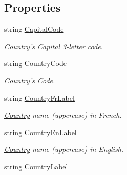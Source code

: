 \subsection*{Properties}
\begin{DoxyCompactItemize}
\item 
string \hyperlink{class_thecallr_api_1_1_objects_1_1_misc_1_1_country_ae5472779a7e2e53b6340faa3e8fca171}{Capital\+Code}
\begin{DoxyCompactList}\small\item\em \hyperlink{class_thecallr_api_1_1_objects_1_1_misc_1_1_country}{Country}'s Capital 3-\/letter code. \end{DoxyCompactList}\item 
string \hyperlink{class_thecallr_api_1_1_objects_1_1_misc_1_1_country_ad53605ad72d876c812539599fddee9a3}{Country\+Code}
\begin{DoxyCompactList}\small\item\em \hyperlink{class_thecallr_api_1_1_objects_1_1_misc_1_1_country}{Country}'s Code. \end{DoxyCompactList}\item 
string \hyperlink{class_thecallr_api_1_1_objects_1_1_misc_1_1_country_a720ea690f46e37e46d7174eb634778da}{Country\+Fr\+Label}
\begin{DoxyCompactList}\small\item\em \hyperlink{class_thecallr_api_1_1_objects_1_1_misc_1_1_country}{Country} name (uppercase) in French. \end{DoxyCompactList}\item 
string \hyperlink{class_thecallr_api_1_1_objects_1_1_misc_1_1_country_a7cdc50ff26233fdb7d3bf0d1c5f217bf}{Country\+En\+Label}
\begin{DoxyCompactList}\small\item\em \hyperlink{class_thecallr_api_1_1_objects_1_1_misc_1_1_country}{Country} name (uppercase) in English. \end{DoxyCompactList}\item 
string \hyperlink{class_thecallr_api_1_1_objects_1_1_misc_1_1_country_a243dc036f1c7e06c7e5cf5cc8aa81011}{Country\+Label}

\end{DoxyCompactItemize}
